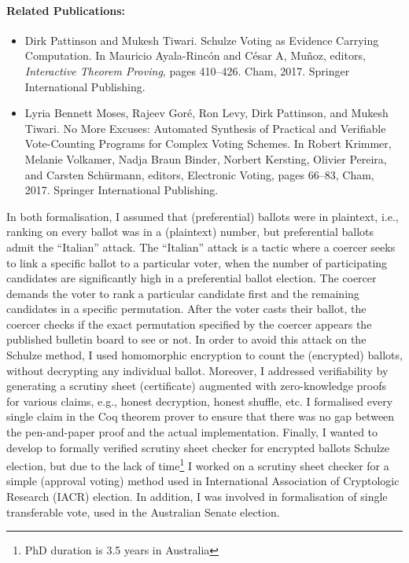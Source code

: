 \documentclass[a4paper]{article}
\begin{document}
\paragraph{Related Publications:}
\begin{itemize}
    \item {Dirk Pattinson and Mukesh Tiwari.} {Schulze Voting as Evidence Carrying Computation}. 
    {In Mauricio Ayala-Rinc{\'o}n 
    and C{\'e}sar A, Mu{\~{n}}oz, editors, \textit{Interactive Theorem Proving}, pages 410--426.
    Cham, 2017. Springer International Publishing.}
    
    \item {Lyria Bennett Moses, Rajeev Gor{\'e}, Ron Levy, Dirk Pattinson, and Mukesh Tiwari.}
    {No More Excuses: Automated Synthesis of Practical and Verifiable Vote-Counting Programs for Complex Voting Schemes.}
    {In Robert Krimmer, Melanie Volkamer, Nadja Braun Binder, Norbert Kersting, Olivier Pereira, and Carsten Sch{\"u}rmann, 
    editors, Electronic Voting, pages 66--83, Cham, 2017. Springer International Publishing.}
    
\end{itemize}

In both formalisation, I assumed that (preferential) ballots were in plaintext, i.e., 
ranking on every ballot was in a (plaintext) number, but preferential ballots 
admit the ``Italian'' attack. The ``Italian'' attack is a tactic where a coercer 
seeks to link a specific ballot 
to a particular voter, when the number of participating candidates 
are significantly high in a preferential ballot election. 
The coercer demands the voter to rank a particular 
candidate first and the remaining candidates in a specific permutation. After the 
voter casts their ballot, the coercer checks if 
the exact permutation specified by the coercer appears the published bulletin board to see or not.
In order to
avoid this attack on the Schulze method, I used homomorphic encryption to count the (encrypted) 
ballots, without decrypting any individual ballot. Moreover, I addressed verifiability
by generating a scrutiny sheet (certificate) augmented with zero-knowledge proofs for 
various claims, e.g., honest decryption, honest shuffle, etc. 
I formalised every single 
claim in the Coq theorem prover to ensure that there was no gap between 
the pen-and-paper proof and the actual implementation. 
Finally, I wanted to develop to formally 
verified scrutiny sheet checker for encrypted ballots Schulze election, but due to the lack of 
time\footnote{PhD duration is 3.5 years in Australia} I worked on a scrutiny sheet checker for a 
simple (approval voting) method used in
International Association of Cryptologic Research (IACR) election.
In addition, I was involved in formalisation of single transferable vote, used in 
the Australian Senate election.
\end{document}
